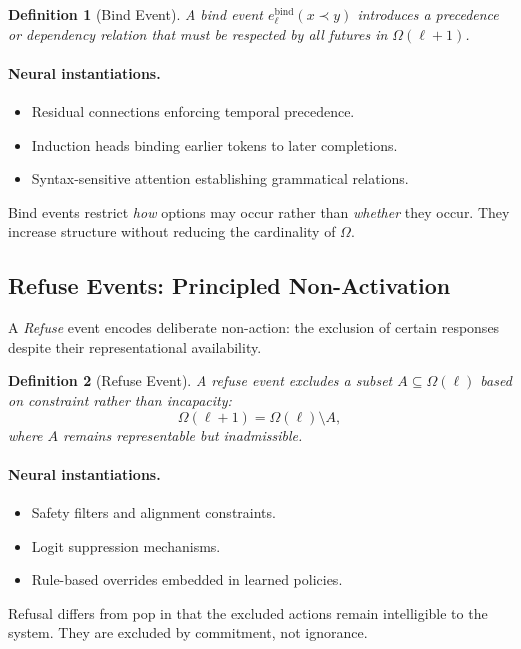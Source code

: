 \documentclass[11pt]{article}
\newtheorem{definition}{Definition}
\theoremstyle{remark}
\begin{document}
\begin{definition}[Bind Event]
A bind event $e^{\mathrm{bind}}_\ell(x \prec y)$ introduces a precedence
or dependency relation that must be respected by all futures in
$\Omega(\ell+1)$.
\end{definition}

\paragraph{Neural instantiations.}
\begin{itemize}
\item Residual connections enforcing temporal precedence.
\item Induction heads binding earlier tokens to later completions.
\item Syntax-sensitive attention establishing grammatical relations.
\end{itemize}

Bind events restrict \emph{how} options may occur rather than
\emph{whether} they occur. They increase structure without reducing
the cardinality of $\Omega$.

\subsection{Refuse Events: Principled Non-Activation}

A \emph{Refuse} event encodes deliberate non-action: the exclusion of
certain responses despite their representational availability.

\begin{definition}[Refuse Event]
A refuse event excludes a subset $A \subseteq \Omega(\ell)$ based on
constraint rather than incapacity:
\[
\Omega(\ell+1) = \Omega(\ell) \setminus A,
\]
where $A$ remains representable but inadmissible.
\end{definition}

\paragraph{Neural instantiations.}
\begin{itemize}
\item Safety filters and alignment constraints.
\item Logit suppression mechanisms.
\item Rule-based overrides embedded in learned policies.
\end{itemize}

Refusal differs from pop in that the excluded actions remain intelligible
to the system. They are excluded by commitment, not ignorance.
\end{document}
